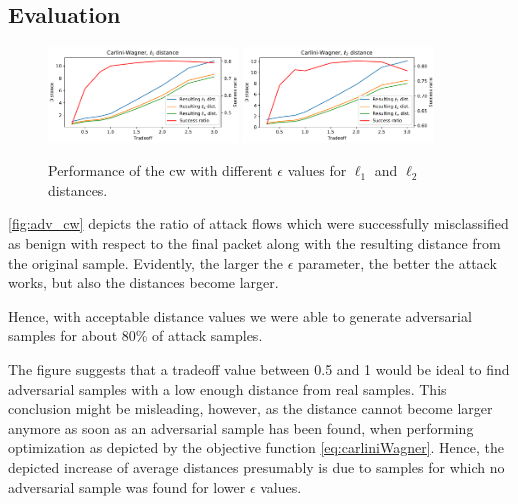 \documentclass[conference]{IEEEtran}
\begin{document}
\subsection{Evaluation}
\begin{figure}
\includegraphics[width=0.45\textwidth]{adv_plots/cwl1.pdf}
\includegraphics[width=0.45\textwidth]{adv_plots/cwl2.pdf}
\caption{Performance of the \gls{cw} with different $\epsilon$ values for $\ell_1$ and $\ell_2$ distances.}
\label{fig:adv_cw}
\end{figure}
\autoref{fig:adv_cw} depicts the ratio of attack flows which were successfully misclassified as benign with respect to the final packet along with the resulting distance from the original sample. Evidently, the larger the $\epsilon$ parameter, the better the attack works, but also the distances become larger.

Hence, with acceptable distance values we were able to generate adversarial samples for about 80\% of attack samples.

The figure suggests that a tradeoff value between 0.5 and 1 would be ideal to find adversarial samples with a low enough distance from real samples. This conclusion might be misleading, however, as the distance cannot become larger anymore as soon as an adversarial sample has been found, when performing optimization as depicted by the objective function \eqref{eq:carliniWagner}. Hence, the depicted increase of average distances presumably is due to samples for which no adversarial sample was found for lower $\epsilon$ values.
\end{document}
